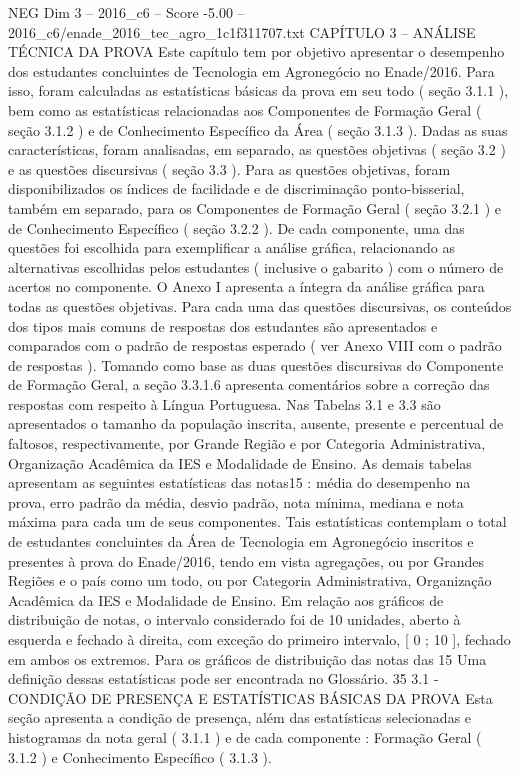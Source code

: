 \begin{textsample}{NEG Dim 3 – 2016\_c6 – Score -5.00 – 2016\_c6/enade\_2016\_tec\_agro\_1c1f311707.txt}  \label{ex:f3_neg_034}
CAPÍTULO 3 – ANÁLISE TÉCNICA DA PROVA Este capítulo tem por objetivo apresentar o desempenho dos estudantes concluintes de Tecnologia em Agronegócio no Enade/2016.
Para isso, foram calculadas as estatísticas básicas da prova em seu todo ( seção 3.1.1 ), bem como as estatísticas relacionadas aos Componentes de Formação Geral ( seção 3.1.2 ) e de Conhecimento Específico da Área ( seção 3.1.3 ).
Dadas as suas características, foram analisadas, em separado, as questões objetivas ( seção 3.2 ) e as questões discursivas ( seção 3.3 ).
Para as questões objetivas, foram disponibilizados os índices de facilidade e de discriminação ponto-bisserial, também em separado, para os Componentes de Formação Geral ( seção 3.2.1 ) e de Conhecimento Específico ( seção 3.2.2 ).
De cada componente, uma das questões foi escolhida para exemplificar a análise gráfica, relacionando as alternativas escolhidas pelos estudantes ( inclusive o gabarito ) com o número de acertos no componente.
O Anexo I apresenta a íntegra da análise gráfica para todas as questões objetivas.
Para cada uma das questões discursivas, os conteúdos dos tipos mais comuns de respostas dos estudantes são apresentados e comparados com o padrão de respostas esperado ( ver Anexo VIII com o padrão de respostas ).
Tomando como base as duas questões discursivas do Componente de Formação Geral, a seção 3.3.1.6 apresenta comentários sobre a correção das respostas com respeito à Língua Portuguesa.
Nas Tabelas 3.1 e 3.3 são apresentados o tamanho da população inscrita, ausente, presente e percentual de faltosos, respectivamente, por Grande Região e por Categoria Administrativa, Organização Acadêmica da IES e Modalidade de Ensino.
As demais tabelas apresentam as seguintes estatísticas das notas15 : média do desempenho na prova, erro padrão da média, desvio padrão, nota mínima, mediana e nota máxima para cada um de seus componentes.
Tais estatísticas contemplam o total de estudantes concluintes da Área de Tecnologia em Agronegócio inscritos e presentes à prova do Enade/2016, tendo em vista agregações, ou por Grandes Regiões e o país como um todo, ou por Categoria Administrativa, Organização Acadêmica da IES e Modalidade de Ensino.
Em relação aos gráficos de distribuição de notas, o intervalo considerado foi de 10 unidades, aberto à esquerda e fechado à direita, com exceção do primeiro intervalo, [ 0 ; 10 ], fechado em ambos os extremos.
Para os gráficos de distribuição das notas das 15 Uma definição dessas estatísticas pode ser encontrada no Glossário. 35 3.1 - CONDIÇÃO DE PRESENÇA E ESTATÍSTICAS BÁSICAS DA PROVA Esta seção apresenta a condição de presença, além das estatísticas selecionadas e histogramas da nota geral ( 3.1.1 ) e de cada componente : Formação Geral ( 3.1.2 ) e Conhecimento Específico ( 3.1.3 ).

\end{textsample}
